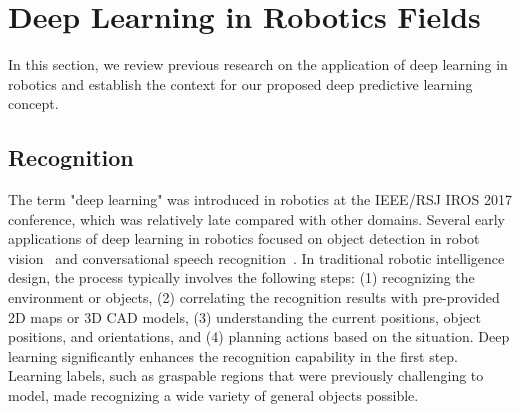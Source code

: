 

\section{Deep Learning in Robotics Fields}

In this section, we review previous research on the application of deep learning in robotics and establish the context for our proposed deep predictive learning concept.



\subsection{Recognition}

The term "deep learning" was introduced in robotics at the IEEE/RSJ IROS 2017 conference, which was relatively late compared with other domains. Several early applications of deep learning in robotics focused on object detection in robot vision~\cite{Ren2016pami,Redmon2016cvpr} and conversational speech recognition~\cite{Hinton2013spm,Graves2014icml}. In traditional robotic intelligence design, the process typically involves the following steps: (1) recognizing the environment or objects, (2) correlating the recognition results with pre-provided 2D maps or 3D CAD models, (3) understanding the current positions, object positions, and orientations, and (4) planning actions based on the situation. Deep learning significantly enhances the recognition capability in the first step. Learning labels, such as graspable regions that were previously challenging to model, made recognizing a wide variety of general objects possible.


